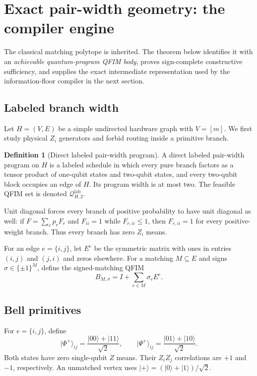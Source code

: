 \documentclass[11pt]{article}
\theoremstyle{definition}
\newtheorem{definition}[definition]{Definition}
\theoremstyle{remark}
\newcommand{\Q}{\mathcal{Q}}
\newcommand{\lab}{\mathrm{lab}}
\newcommand{\ket}[1]{\lvert #1\rangle}
\begin{document}
\section{Exact pair-width geometry: the compiler engine}

\begin{claimbox}[title={Role of the matching theorem}]
The classical matching polytope is inherited. The theorem below identifies it with an \emph{achievable quantum-program QFIM body}, proves sign-complete constructive sufficiency, and supplies the exact intermediate representation used by the information-floor compiler in the next section.
\end{claimbox}

\subsection{Labeled branch width}
Let $H=(V,E)$ be a simple undirected hardware graph with $V=[m]$. We first study physical $Z_i$ generators and forbid routing inside a primitive branch.

\begin{definition}[Direct labeled pair-width program]
\label{def:pair-program}
A direct labeled pair-width program on $H$ is a labeled schedule in which every pure branch factors as a tensor product of one-qubit states and two-qubit states, and every two-qubit block occupies an edge of $H$. Its program width is at most two. The feasible QFIM set is denoted $\Q^{\lab}_{H,2}$.
\end{definition}

Unit diagonal forces every branch of positive probability to have unit diagonal as well: if $F=\sum_rp_rF_r$ and $F_{ii}=1$ while $F_{r,ii}\le1$, then $F_{r,ii}=1$ for every positive-weight branch. Thus every branch has zero $Z_i$ means.

For an edge $e=\{i,j\}$, let $E^e$ be the symmetric matrix with ones in entries $(i,j)$ and $(j,i)$ and zeros elsewhere. For a matching $M\subseteq E$ and signs $\sigma\in\{\pm1\}^{M}$, define the signed-matching QFIM
\begin{equation}
  B_{M,\sigma}=I+\sum_{e\in M}\sigma_eE^e.
  \label{eq:signed-matching-matrix}
\end{equation}

\subsection{Bell primitives}
For $e=\{i,j\}$, define
\begin{equation}
  \ket{\Phi^+}_{ij}=\frac{\ket{00}+\ket{11}}{\sqrt2},
  \qquad
  \ket{\Psi^+}_{ij}=\frac{\ket{01}+\ket{10}}{\sqrt2}.
  \label{eq:bell-primitives}
\end{equation}
Both states have zero single-qubit $Z$ means. Their $Z_iZ_j$ correlations are $+1$ and $-1$, respectively. An unmatched vertex uses $\ket{+}=(\ket0+\ket1)/\sqrt2$.
\end{document}
